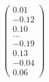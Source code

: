 \documentclass[preview]{standalone}
\begin{document}
\begin{align*}
\begin{pmatrix} 0.01 \\ -0.12 \\ 0.10 \\ \dots \\ -0.19 \\ 0.13 \\ -0.04 \\ 0.06 \end{pmatrix}
\end{align*}
\end{document}
